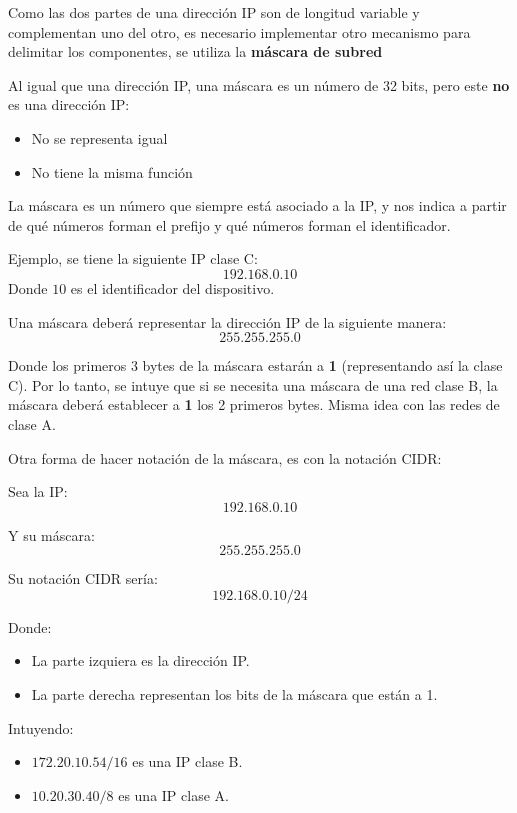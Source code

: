 \documentclass[11pt]{article}
\begin{document}
Como las dos partes de una dirección IP son de
longitud variable y complementan uno del otro, es
necesario implementar otro mecanismo para
delimitar los componentes, se utiliza la \textbf{máscara
de subred}

Al igual que una dirección IP, una máscara es un
número de 32 bits, pero este \textbf{no} es una dirección
IP:
\begin{itemize}
\item No se representa igual
\item No tiene la misma función
\end{itemize}
La máscara es un número que siempre está asociado
a la IP, y nos indica a partir de qué números
forman el prefijo y qué números forman el identificador.

Ejemplo, se tiene la siguiente IP clase C:
$$192.168.0.10$$
Donde \(10\) es el identificador del dispositivo.

Una máscara deberá representar la dirección IP de
la siguiente manera:
$$255.255.255.0$$

Donde los primeros 3 bytes de la máscara estarán a
\textbf{1} (representando así la clase C).
Por lo tanto, se intuye que si se necesita una
máscara de una red clase B, la máscara deberá
establecer a \textbf{1} los 2 primeros bytes. Misma idea
con las redes de clase A.

Otra forma de hacer notación de la máscara, es con
la notación CIDR:

Sea la IP:
$$192.168.0.10$$

Y su máscara:
$$255.255.255.0$$

Su notación CIDR sería:
$$192.168.0.10 / 24$$

Donde:
\begin{itemize}
\item La parte izquiera es la dirección IP.
\item La parte derecha representan los bits de la
máscara que están a 1.
\end{itemize}

Intuyendo:
\begin{itemize}
\item \(172.20.10.54 / 16\) es una IP clase B.
\item \(10.20.30.40 / 8\) es una IP clase A.
\end{itemize}
\end{document}
